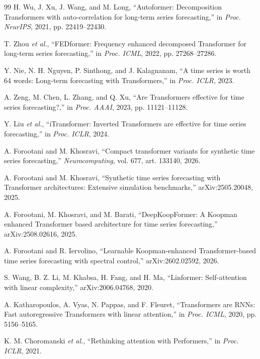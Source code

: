 \documentclass[journal]{IEEEtran}
\begin{document}
\begin{thebibliography}{99}
H. Wu, J. Xu, J. Wang, and M. Long, ``Autoformer: Decomposition Transformers with auto-correlation for long-term series forecasting,'' in \emph{Proc. NeurIPS}, 2021, pp. 22419--22430.

T. Zhou \emph{et al.}, ``FEDformer: Frequency enhanced decomposed Transformer for long-term series forecasting,'' in \emph{Proc. ICML}, 2022, pp. 27268--27286.

Y. Nie, N. H. Nguyen, P. Sinthong, and J. Kalagnanam, ``A time series is worth 64 words: Long-term forecasting with Transformers,'' in \emph{Proc. ICLR}, 2023.

A. Zeng, M. Chen, L. Zhang, and Q. Xu, ``Are Transformers effective for time series forecasting?,'' in \emph{Proc. AAAI}, 2023, pp. 11121--11128.

Y. Liu \emph{et al.}, ``iTransformer: Inverted Transformers are effective for time series forecasting,'' in \emph{Proc. ICLR}, 2024.

A. Forootani and M. Khosravi, ``Compact transformer variants for synthetic time series forecasting,'' \emph{Neurocomputing}, vol. 677, art. 133140, 2026.

A. Forootani and M. Khosravi, ``Synthetic time series forecasting with Transformer architectures: Extensive simulation benchmarks,'' arXiv:2505.20048, 2025.

A. Forootani, M. Khosravi, and M. Barati, ``DeepKoopFormer: A Koopman enhanced Transformer based architecture for time series forecasting,'' arXiv:2508.02616, 2025.

A. Forootani and R. Iervolino, ``Learnable Koopman-enhanced Transformer-based time series forecasting with spectral control,'' arXiv:2602.02592, 2026.

S. Wang, B. Z. Li, M. Khabsa, H. Fang, and H. Ma, ``Linformer: Self-attention with linear complexity,'' arXiv:2006.04768, 2020.

A. Katharopoulos, A. Vyas, N. Pappas, and F. Fleuret, ``Transformers are RNNs: Fast autoregressive Transformers with linear attention,'' in \emph{Proc. ICML}, 2020, pp. 5156--5165.

K. M. Choromanski \emph{et al.}, ``Rethinking attention with Performers,'' in \emph{Proc. ICLR}, 2021.

\end{thebibliography}
\end{document}
